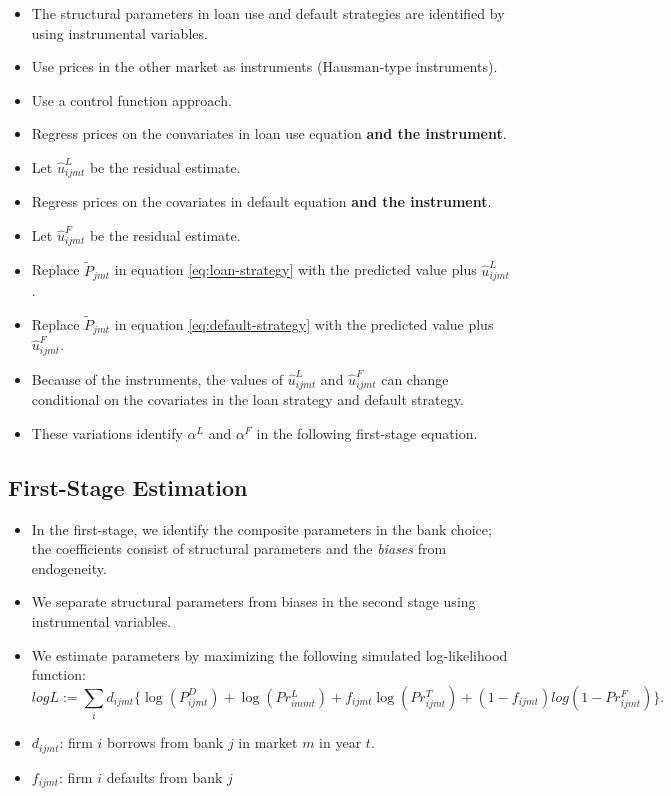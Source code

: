 \documentclass[]{book}
\providecommand{\tightlist}{%
  \setlength{\itemsep}{0pt}\setlength{\parskip}{0pt}}
\begin{document}
\begin{itemize}
\tightlist
\item
  The structural parameters in loan use and default strategies are
  identified by using instrumental variables.
\item
  Use prices in the other market as instruments (Hausman-type
  instruments).
\item
  Use a control function approach.
\item
  Regress prices on the convariates in loan use equation \textbf{and the
  instrument}.
\item
  Let \(\hat{u}_{ijmt}^L\) be the residual estimate.
\item
  Regress prices on the covariates in default equation \textbf{and the
  instrument}.
\item
  Let \(\hat{u}_{ijmt}^F\) be the residual estimate.
\item
  Replace \(\tilde{P}_{jmt}\) in equation \eqref{eq:loan-strategy} with
  the predicted value plus \(\hat{u}_{ijmt}^L\).
\item
  Replace \(\tilde{P}_{jmt}\) in equation \eqref{eq:default-strategy} with
  the predicted value plus \(\hat{u}_{ijmt}^F\).
\item
  Because of the instruments, the values of \(\hat{u}_{ijmt}^L\) and
  \(\hat{u}_{ijmt}^F\) can change conditional on the covariates in the
  loan strategy and default strategy.
\item
  These variations identify \(\alpha^L\) and \(\alpha^F\) in the
  following first-stage equation.
\end{itemize}

\subsection{First-Stage Estimation}\label{first-stage-estimation}

\begin{itemize}
\tightlist
\item
  In the first-stage, we identify the composite parameters in the bank
  choice; the coefficients consist of structural parameters and the
  \emph{biases} from endogeneity.
\item
  We separate structural parameters from biases in the second stage
  using instrumental variables.
\item
  We estimate parameters by maximizing the following simulated
  log-likelihood function: \[
  log L := \sum_{i} d_{ijmt} \{\log(P_{ijmt}^D) + \log (Pr_{immt}^L) + f_{ijmt} \log (Pr_{ijmt}^T) + (1 - f_{ijmt}) log (1 - Pr_{ijmt}^F) \}.
  \]
\item
  \(d_{ijmt}\): firm \(i\) borrows from bank \(j\) in market \(m\) in
  year \(t\).
\item
  \(f_{ijmt}\): firm \(i\) defaults from bank \(j\)
\end{itemize}
\end{document}
